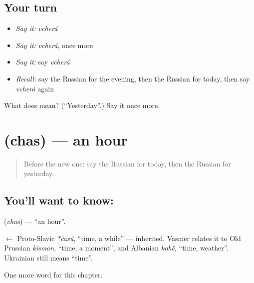 \subsection*{Your turn}
\begin{itemize}
\raggedright
  \item \emph{Say it:} \emph{vcherá}
  \item \emph{Say it:} \emph{vcherá}, once more
  \item \emph{Say it:} say \emph{vcherá}
  \item \emph{Recall:} say the Russian for the evening, then the Russian for today, then say \emph{vcherá} again
\end{itemize}

\begin{tcolorbox}[breakable,colback=teal!4,colframe=teal!35!black,title={Before you move on}]
What does  mean? (\textquotedblleft{}Yesterday\textquotedblright{}.) Say it once more.
\end{tcolorbox}
\section[\texorpdfstring{\ru{час} (chas)}{час (chas)}]{ (chas) — an hour}

\label{lesson:RU-C69-hour}



\begin{quote}
Before the new one: say the Russian for today, then the Russian for yesterday.
\end{quote}

\subsection*{You'll want to know: }
\textbf{} (\emph{chas}) — \textquotedblleft{}an hour\textquotedblright{}.

\begin{cousinweb}
\textbf{} $\leftarrow$ Proto-Slavic \emph{*časŭ}, \textquotedblleft{}time, a while\textquotedblright{} — inherited. Vasmer relates it to Old Prussian \emph{kīsman}, \textquotedblleft{}time, a moment\textquotedblright{}, and Albanian \emph{kohë}, \textquotedblleft{}time, weather\textquotedblright{}. Ukrainian \emph{} still means \textquotedblleft{}time\textquotedblright{}.
\end{cousinweb}

\begin{grammarlens}[title={What you've built}]
One more word for this chapter.
\end{grammarlens}

